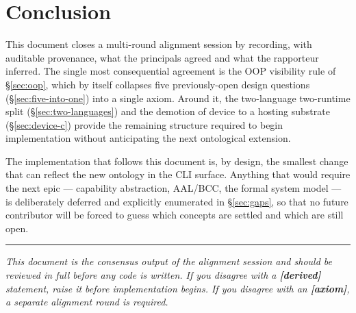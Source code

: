 \documentclass[11pt,a4paper]{article}
\begin{document}
\section{Conclusion}

This document closes a multi-round alignment session by recording, with
auditable provenance, what the principals agreed and what the rapporteur
inferred. The single most consequential agreement is the OOP visibility
rule of \S\ref{sec:oop}, which by itself collapses five previously-open
design questions (\S\ref{sec:five-into-one}) into a single axiom. Around it,
the two-language two-runtime split (\S\ref{sec:two-languages}) and the
demotion of device to a hosting substrate (\S\ref{sec:device-c}) provide the
remaining structure required to begin implementation without anticipating
the next ontological extension.

The implementation that follows this document is, by design, the smallest
change that can reflect the new ontology in the CLI surface. Anything that
would require the next epic --- capability abstraction, AAL/BCC, the formal
system model --- is deliberately deferred and explicitly enumerated in
\S\ref{sec:gaps}, so that no future contributor will be forced to guess
which concepts are settled and which are still open.

\vfill
\hrule
\vspace{0.4em}
\noindent\small
\textit{This document is the consensus output of the alignment session and
should be reviewed in full before any code is written. If you disagree with
a \textbf{[derived]} statement, raise it before implementation begins. If
you disagree with an \textbf{[axiom]}, a separate alignment round is
required.}
\end{document}
